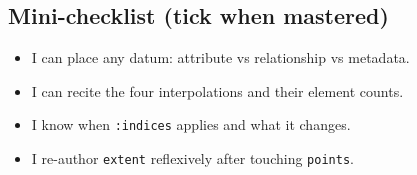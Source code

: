 \subsection*{Mini-checklist (tick when mastered)}
\begin{itemize}[leftmargin=*]
  \item[$\square$] I can place any datum: attribute vs relationship vs metadata.
  \item[$\square$] I can recite the four interpolations and their element counts.
  \item[$\square$] I know when \texttt{:indices} applies and what it changes.
  \item[$\square$] I re-author \texttt{extent} reflexively after touching \texttt{points}.
\end{itemize}

